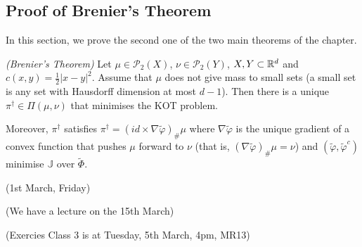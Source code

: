 \documentclass[12pt,a4paper]{article}
\begin{document}
\subsection{Proof of Brenier's Theorem}

In this section, we prove the second one of the two main theorems of the chapter.
\s

 \emph{(Brenier's Theorem)} Let $\mu \in \mathscr{P}_2(X)$, $\nu \in \mathscr{P}_2(Y)$, $X, Y\subset \mathbb{R}^d$ and $c(x,y) = \frac{1}{2} |x-y|^2$. Assume that $\mu$ does not give mass to small sets (a small set is any set with Hausdorff dimension at most $d-1$). Then there is a unique $\pi^{\dagger} \in \Pi(\mu, \nu)$ that minimises the KOT problem.

\quad Moreover, $\pi^{\dagger}$ satisfies $\pi^{\dagger} = (id \times \nabla \tilde{\varphi})_{\#} \mu$ where $\nabla \tilde{\varphi}$ is the unique gradient of a convex function that pushes $\mu$ forward to $\nu$ (that is, $(\nabla \tilde{\varphi})_{\#} \mu = \nu$) and $(\tilde{\varphi},\tilde{\varphi}^c)$ minimise $\mathbb{J}$ over $\tilde{\Phi}$.
\s

\newday

(1st March, Friday)
\s

(We have a lecture on the 15th March)

(Exercies Class 3 is at Tuesday, 5th March, 4pm, MR13)
\s
\end{document}
